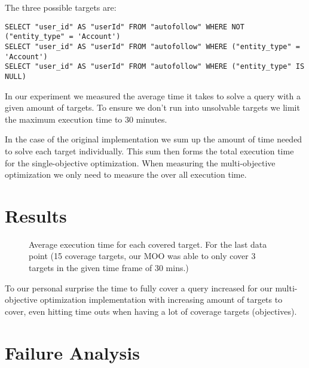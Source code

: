 The three possible targets are:
\begin{verbatim}
SELECT "user_id" AS "userId" FROM "autofollow" WHERE NOT ("entity_type" = 'Account')
SELECT "user_id" AS "userId" FROM "autofollow" WHERE ("entity_type" = 'Account')
SELECT "user_id" AS "userId" FROM "autofollow" WHERE ("entity_type" IS NULL)
\end{verbatim}

In our experiment we measured the average time it takes to solve a query with a given amount of targets. To ensure we don't run into unsolvable targets we limit the maximum execution time to 30 minutes.

In the case of the original implementation we sum up the amount of time needed to solve each target individually. This sum then forms the total execution time for the single-objective optimization. When measuring the multi-objective optimization we only need to measure the over all execution time.

\section{Results}
\label{sec:results}

\begin{figure}
	\centering
	\caption{Average execution time for each covered target. For the last data point (15 coverage targets, our MOO was able to only cover 3 targets in the given time frame of 30 mins.)}
	\label{fig:execution_time_results}
\end{figure}

To our personal surprise the time to fully cover a query increased for our multi-objective optimization implementation with increasing amount of targets to cover, even hitting time outs when having a lot of coverage targets (objectives).

\section{Failure Analysis}

